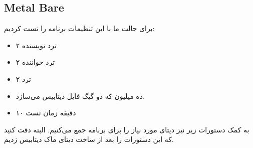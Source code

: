 \subsection{Metal Bare}
برای حالت
ما با این تنظیمات برنامه را تست کردیم:
\begin{itemize}
    \item ۲ ترد نویسنده
    \item ۲ ترد خواننده
    \item ۲ ترد 
    \item ده میلیون  که دو گیگ فایل دیتابیس می‌سازد.
    \item ۱۰ دقیقه زمان تست
\end{itemize}
به کمک دستورات زیر نیز دیتای مورد نیاز را برای برنامه جمع می‌کنیم. البته دقت کنید که این دستورات
را بعد از ساخت دیتای ماک دیتابیس زدیم.
